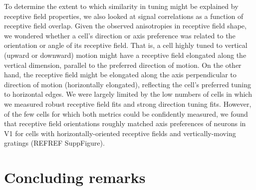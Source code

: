 To determine the extent to which similarity in tuning might be explained by receptive field properties, we also looked at signal correlations as a function of receptive field overlap. Given the observed anisotropies in receptive field shape, we wondered whether a cell's direction or axis preference was related to the orientation or angle of its receptive field. That is, a cell highly tuned to vertical (upward or downward) motion might have a receptive field elongated along the vertical dimension, parallel to the preferred direction of motion. On the other hand, the receptive field might be elongated along the axis perpendicular to direction of motion (horizontally elongated), reflecting the cell's preferred tuning to horizontal edges. We were largely limited by the low numbers of cells in which we measured robust receptive field fits and strong direction tuning fits. However, of the few cells for which both metrics could be confidently measured, we found that receptive field orientations roughly matched axis preferences of neurons in V1 for cells with horizontally-oriented receptive fields and vertically-moving gratings (REFREF SuppFigure). 


\section{Concluding remarks}


